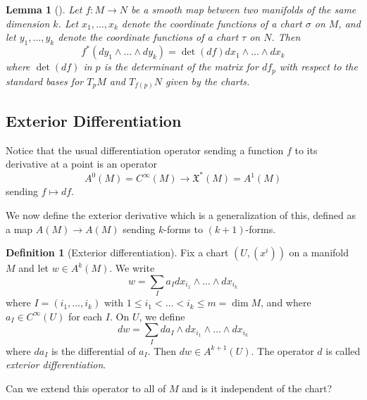 \documentclass[reqno]{amsart}
\newtheorem{lemma}[theorem]{Lemma}
\theoremstyle{definition}
\newtheorem{definition}[theorem]{Definition}
\theoremstyle{remark}
\begin{document}
      \begin{lemma}[]
          Let $f \colon M \to N$ be a smooth map between
          two manifolds of the same dimension $k$. Let
          $x_1, \ldots, x_k$ denote the coordinate functions of
          a chart $\sigma$ on $M$, and let $y_1,\ldots, y_k$ 
          denote the coordinate functions of a chart
          $\tau$ on $N$. Then
          \[
          f^{*}\left( dy_1 \wedge \ldots \wedge
          dy_k\right) = \det (df) 
          dx_1 \wedge \ldots \wedge dx_k
          \] 
          where $\det (df)$ in $p$ is the determinant of the matrix
          for $df_p$ with respect to the standard bases for
          $T_pM$ and $T_{f(p)}N$ given by the charts.
      \end{lemma}



      \subsection{Exterior Differentiation}

      Notice that
      the usual differentiation operator
      sending a function $f$ to its derivative
      at a point is an operator
      \[
          A^{0}(M) = C^{\infty}(M) \to 
          \mathfrak{X}^{*}(M) =  A^{1}(M)
      \] 
      sending $f \mapsto df$.

      We now define the exterior derivative which
      is a generalization of this, defined as a map
      $A(M) \to A(M)$ sending $k$-forms to
      $(k+1)$-forms.

      \begin{definition}[Exterior differentiation]
          Fix a chart $\left( U, (x^{i}) \right) $ on
           a manifold $M$ and let
           $w \in A^{k}(M)$. We write
           \[
           w = \sum_{I} a_I dx_{i_1} \wedge \ldots
           \wedge dx_{i_k}
           \] 
           where $I = \left( i_1,\ldots, i_k \right) $ with
           $1 \le i_1 < \ldots < i_k \le m = \dim M$, and
           where $a_I \in C^{\infty}\left( U \right) $ for
           each $I$. On $U$, we define
           \[
           dw = \sum_I da_I \wedge dx_{i_1} \wedge
           \ldots \wedge d x_{i_k} \tag{$\Omega$} \label{eq:Omega}
           \] 
           where $da_I$ is the differential of $a_I$. Then
           $dw \in A^{k+1}\left( U \right) $.
           The operator $d$ is called
           \textit{exterior differentiation}.
      \end{definition}

      Can we extend this operator to all
      of $M$ and is it independent of the chart?
\end{document}
